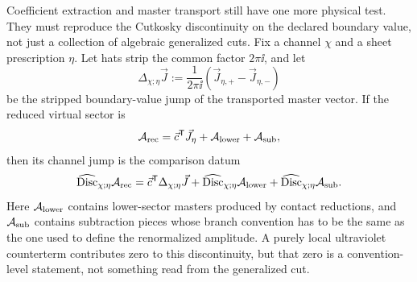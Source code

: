 \begin{controlledapproximation}
\label{ca:master-discontinuity-closure-gate}
Coefficient extraction and master transport still have one more physical
test.  They must reproduce the Cutkosky discontinuity on the declared
boundary value, not just a collection of algebraic generalized cuts.  Fix a
channel \(\chi\) and a sheet prescription \(\eta\).  Let hats strip the common
factor \(2\pi\ii\), and let
\[
  \Delta_{\chi;\eta}\vec J
  :=
  \frac{1}{2\pi\ii}
  \left(
    \vec J_{\eta,+}-\vec J_{\eta,-}
  \right)
\]
be the stripped boundary-value jump of the transported master vector.  If the
reduced virtual sector is
\[
  \mathcal A_{\rm rec}
  =
  \vec c^{\mathsf T}\vec J_\eta
  +\mathcal A_{\rm lower}
  +\mathcal A_{\rm sub},
\]
then its channel jump is the comparison datum
\begin{equation}
  \widehat{\operatorname{Disc}}_{\chi;\eta}\mathcal A_{\rm rec}
  =
  \vec c^{\mathsf T}\Delta_{\chi;\eta}\vec J
  +
  \widehat{\operatorname{Disc}}_{\chi;\eta}\mathcal A_{\rm lower}
  +
  \widehat{\operatorname{Disc}}_{\chi;\eta}\mathcal A_{\rm sub}.
  \label{eq:master-discontinuity-closure-reconstruction}
\end{equation}
Here \(\mathcal A_{\rm lower}\) contains lower-sector masters produced by
contact reductions, and \(\mathcal A_{\rm sub}\) contains subtraction pieces
whose branch convention has to be the same as the one used to define the
renormalized amplitude.  A purely local ultraviolet counterterm contributes
zero to this discontinuity, but that zero is a convention-level statement, not
something read from the generalized cut.


\end{controlledapproximation}
